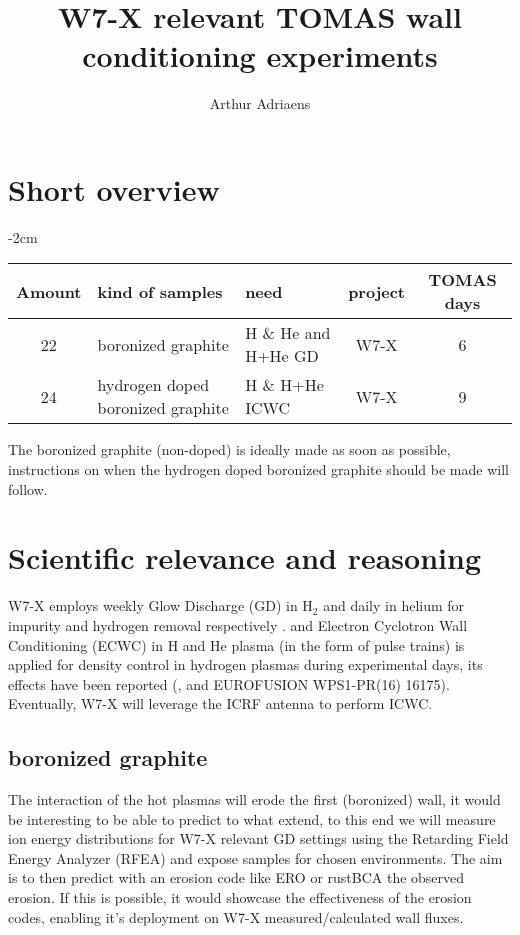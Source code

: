 \documentclass{article}
\title{W7-X relevant TOMAS wall conditioning experiments}
\author{Arthur Adriaens}
\begin{document}
\maketitle

\section{Short overview}
\begin{center}
    \addtolength{\leftskip} {-2cm} %
    \addtolength{\rightskip}{-2cm}
    \begin{tabular}{||c p{4cm} p{4cm} c c||}
         \hline
         Amount & kind of samples & need & project & TOMAS days \\ [0.5ex]
         \hline\hline
         22 & boronized graphite & H \& He and H+He GD & W7-X & 6 \\
         24 & hydrogen doped boronized graphite & H \& H+He ICWC & W7-X & 9 \\
         \hline
    \end{tabular}
\end{center}
The boronized graphite (non-doped) is ideally made as soon as possible,
instructions on when the hydrogen doped boronized graphite should be made will
follow.
\section{Scientific relevance and reasoning}
W7-X employs weekly Glow Discharge (GD) in H$_2$ and daily in helium for
impurity and hydrogen removal respectively \cite{AndreiNucMatEn}. and Electron
Cyclotron Wall Conditioning (ECWC) in H and He plasma (in the form of pulse trains)
is applied for density control in hydrogen plasmas during experimental days, 
its effects have been reported (\cite{Goriaev_2020},\cite{WAUTERS2018235} and
EUROFUSION WPS1-PR(16) 16175). Eventually, W7-X will leverage the ICRF
antenna to perform ICWC.

\subsection*{boronized graphite}
The interaction of the hot plasmas will erode the first (boronized) wall, it
would be interesting to be able to predict to what extend, to this end we will
measure ion energy distributions for W7-X relevant GD settings using the
Retarding Field Energy Analyzer (RFEA) and expose samples for chosen
environments. The aim is to then predict with an erosion code like ERO or
rustBCA the observed erosion. If this is possible, it would showcase the
effectiveness of the erosion codes, enabling it's deployment on W7-X
measured/calculated wall fluxes.
\end{document}
